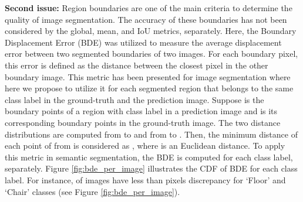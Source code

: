 \documentclass[journal,transmag]{IEEEtran}
\begin{document}
\textbf{Second issue:} Region boundaries are one of the main criteria to determine the quality of image segmentation. The accuracy of these boundaries has not been considered by the global, mean, and IoU metrics, separately. Here, the Boundary Displacement Error (BDE) \cite{freixenet2002yet} was utilized to measure the average displacement error between two segmented boundaries of two images. For each boundary pixel, this error  is defined as the distance between the closest pixel in the other boundary image. This metric has been presented for image segmentation where here we propose to utilize it for each segmented region that belongs to the same class label in the ground-truth and the prediction image. Suppose  is the boundary points of a region with class label  in a prediction image and  is its corresponding boundary points in the ground-truth image. The two distance distributions are computed from  to  and from  to . Then, the minimum distance of each point of  from  is considered as  , where  is an Euclidean distance. 
To apply this metric in semantic segmentation, the BDE is computed for each class label, separately. Figure \ref{fig:bde_per_image} illustrates the CDF of BDE for each class label. For instance,  of images have less than  pixels discrepancy for ‘Floor’ and ‘Chair’ classes (see Figure \ref{fig:bde_per_image}).

\begin{figure*}
	 \hspace{0.05cm}
	\hspace{0.05cm}
	\vspace{0.1cm}
	 \hspace{0.05cm}
	\hspace{0.05cm}
	\vspace{0.1cm}
	\caption{Comparison of boundary displacement error for each class label.}
	\label{fig:bde_per_image}
\end{figure*}
 
\end{document}
